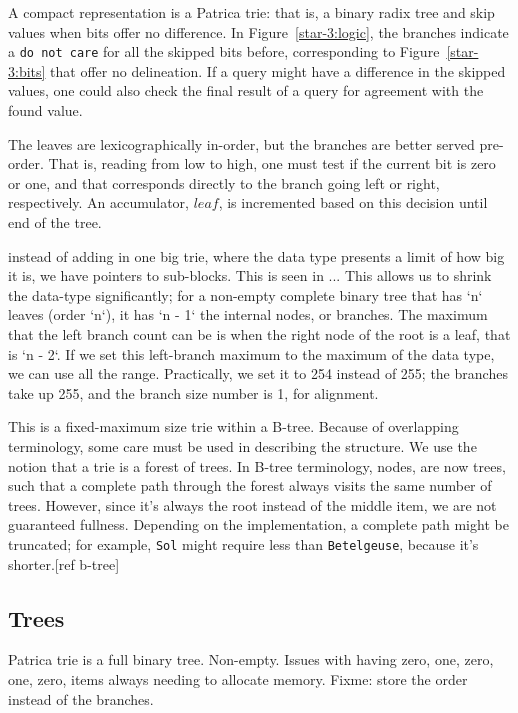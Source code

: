 \documentclass[12pt]{article}
\newcommand{\code}[1]{\colorbox{light-gray}{\texttt{#1}}}
\begin{document}
A compact representation is a Patrica trie\cite{morrison1968patricia}: that is, a binary radix tree and skip values when bits offer no difference. In Figure~\ref{star-3:logic}, the branches indicate a \code{do not care} for all the skipped bits before, corresponding to Figure~\ref{star-3:bits} that offer no delineation. If a query might have a difference in the skipped values, one could also check the final result of a query for agreement with the found value.

The leaves are lexicographically in-order, but the branches are better served pre-order. That is, reading from low to high, one must test if the current bit is zero or one, and that corresponds directly to the branch going left or right, respectively. An accumulator, $leaf$, is incremented based on this decision until end of the tree.

instead of adding in one big trie, where the data type presents a limit of how big it is, we have pointers to sub-blocks. This is seen in ... This allows us to shrink the data-type significantly; for a non-empty complete binary tree that has `n` leaves (order `n`), it has `n - 1` the internal nodes, or branches. The maximum that the left branch count can be is when the right node of the root is a leaf, that is `n - 2`. If we set this left-branch maximum to the maximum of the data type, we can use all the range. Practically, we set it to 254 instead of 255; the branches take up 255, and the branch size number is 1, for alignment.

This is a fixed-maximum size trie within a B-tree. Because of overlapping terminology, some care must be used in describing the structure. We use the notion that a trie is a forest of trees. In B-tree terminology, nodes, are now trees, such that a complete path through the forest always visits the same number of trees. However, since it's always the root instead of the middle item, we are not guaranteed fullness. Depending on the implementation, a complete path might be truncated; for example, \code{Sol} might require less than \code{Betelgeuse}, because it's shorter.[ref b-tree]

\subsection{Trees}

Patrica trie is a full binary tree. Non-empty. Issues with having zero, one, zero, one, zero, items always needing to allocate memory. Fixme: store the order instead of the branches.
\end{document}
